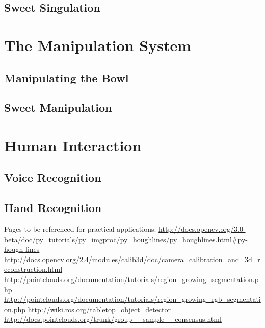 \subsection{Sweet Singulation}
\section{The Manipulation System}
\subsection{Manipulating the Bowl}
\subsection{Sweet Manipulation}
\section{Human Interaction}
\subsection{Voice Recognition}
\subsection{Hand Recognition}
Pages to be referenced for practical applications:
\newline
\url{http://docs.opencv.org/3.0-beta/doc/py_tutorials/py_imgproc/py_houghlines/py_houghlines.html#py-hough-lines}
\url{http://docs.opencv.org/2.4/modules/calib3d/doc/camera_calibration_and_3d_reconstruction.html}
\url{http://pointclouds.org/documentation/tutorials/region_growing_segmentation.php}
\newline
\url{http://pointclouds.org/documentation/tutorials/region_growing_rgb_segmentation.php}
\newline
\url{http://wiki.ros.org/tabletop_object_detector}
\newline
\url{http://docs.pointclouds.org/trunk/group__sample__consensus.html}
\newline
\newline
~\cite{kinectfusion}
~\cite{objectlabelling}
~\cite{herbrobot}
~\cite{reliablegrasping}